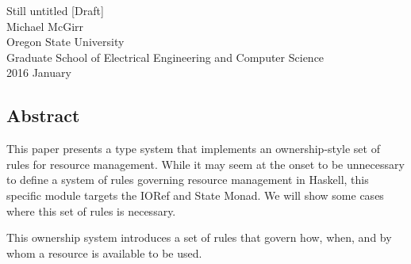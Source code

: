 \documentclass[10pt]{article}
\begin{document}
\vspace{2.0cm}

\begin{center}
    {\huge Still untitled [Draft] } 
    \vspace{0.4cm} \\
    {\large Michael McGirr} 
    \vspace{0.1cm} \\
    {\large Oregon State University} 
    \vspace{0.1cm} \\
    {\large Graduate School of Electrical Engineering and Computer Science}  
    \vspace{0.4cm} \\
    {\large 2016 January}  
\end{center}

\vspace{1.0cm}

\begin{multicols}{2}

    \section*{Abstract}

    This paper presents a type system that implements an ownership-style set of 
    rules for resource management.  While it may seem at the onset to be 
    unnecessary to define a system of rules governing resource management in 
    Haskell, this specific module targets the IORef and State Monad. We will 
    show some cases where this set of rules is necessary. 
    
    This ownership system introduces a set of rules that govern how, when, and
    by whom a resource is available to be used.

\end{multicols}
\end{document}
